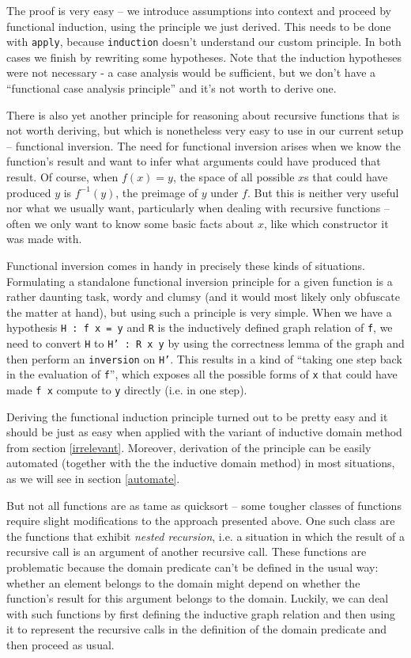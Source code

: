 \documentclass[declaration,mgr,english,shortabstract]{iithesis}
\newcommand{\m}[1]{\texttt{#1}}
\begin{document}
The proof is very easy -- we introduce assumptions into context and proceed by functional induction, using the principle we just derived. This needs to be done with \m{apply}, because \m{induction} doesn't understand our custom principle. In both cases we finish by rewriting some hypotheses. Note that the induction hypotheses were not necessary - a case analysis would be sufficient, but we don't have a ``functional case analysis principle'' and it's not worth to derive one.

There is also yet another principle for reasoning about recursive functions that is not worth deriving, but which is nonetheless very easy to use in our current setup -- functional inversion. The need for functional inversion arises when we know the function's result and want to infer what arguments could have produced that result. Of course, when $f(x) = y$, the space of all possible $x$s that could have produced $y$ is $f^{-1}(y)$, the preimage of $y$ under $f$. But this is neither very useful nor what we usually want, particularly when dealing with recursive functions -- often we only want to know some basic facts about $x$, like which constructor it was made with.

Functional inversion comes in handy in precisely these kinds of situations. Formulating a standalone functional inversion principle for a given function is a rather daunting task, wordy and clumsy (and it would most likely only obfuscate the matter at hand), but using such a principle is very simple. When we have a hypothesis \m{H : f x = y} and \m{R} is the inductively defined graph relation of \m{f}, we need to convert \m{H} to \m{H' : R x y} by using the correctness lemma of the graph and then perform an \m{inversion} on \m{H'}. This results in a kind of ``taking one step back in the evaluation of \m{f}'', which exposes all the possible forms of \m{x} that could have made \m{f x} compute to \m{y} directly (i.e. in one step).

Deriving the functional induction principle turned out to be pretty easy and it should be just as easy when applied with the variant of inductive domain method from section \ref{irrelevant}. Moreover, derivation of the principle can be easily automated (together with the the inductive domain method) in most situations, as we will see in section \ref{automate}.

But not all functions are as tame as quicksort -- some tougher classes of functions require slight modifications to the approach presented above. One such class are the functions that exhibit \textit{nested recursion}, i.e. a situation in which the result of a recursive call is an argument of another recursive call. These functions are problematic because the domain predicate can't be defined in the usual way: whether an element belongs to the domain might depend on whether the function's result for this argument belongs to the domain. Luckily, we can deal with such functions by first defining the inductive graph relation and then using it to represent the recursive calls in the definition of the domain predicate and then proceed as usual.
\end{document}
